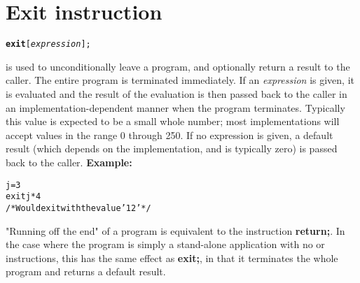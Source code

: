 \chapter{Exit instruction}\label{refexit}
\begin{shaded}
\begin{alltt}
\textbf{exit} [\emph{expression}];
\end{alltt}
\end{shaded}
  is used to unconditionally leave a program, and
optionally return a result to the caller.
The entire program is terminated immediately.
 If an \emph{expression} is given, it is evaluated and the result
of the evaluation is then passed back to the caller in an
implementation-dependent manner when the program terminates.
Typically this value is expected to be a small whole number; most
implementations will accept values in the range 0 through 250.
If no expression is given, a default result (which depends on the
implementation, and is typically zero) is passed back to the caller.
 \textbf{Example:}
\begin{alltt}
j=3
exit j*4
/* Would exit with the value '12' */
\end{alltt}
 "Running off the end" of a program is equivalent to the
instruction \textbf{return;}.  In the case where the program is simply
a stand-alone application with no  or 
instructions, this has the same effect as \textbf{exit;}, in that it
terminates the whole program and returns a default result.
